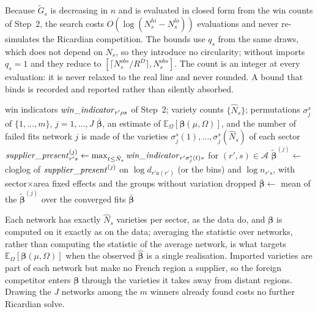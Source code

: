 Because $\tilde{G}_s$ is decreasing in $n$ and is evaluated in closed form from the win counts of Step~2, the search costs $O(\log(N^{hi}_s-N^{lo}_s))$ evaluations and never re-simulates the Ricardian competition. The bounds use $q_s$ from the same draws, which does not depend on $N_s$, so they introduce no circularity; without imports $q_s=1$ and they reduce to $[\lceil N^{obs}_s/R^D\rceil,N^{obs}_s]$. The count is an integer at every evaluation: it is never relaxed to the real line and never rounded. A bound that binds is recorded and reported rather than silently absorbed.

\begin{algorithm}[H]
\caption{\textsc{ExtensiveMarginCoefficients}: the extensive-margin coefficients, averaged over $J$ networks}
\label{alg:cellbeta}
\small
\begin{algorithmic}[1]
\Require win indicators $\mathit{win\_indicator}_{r'\rho s}$ of Step~2; variety counts $\{\hat N_s\}$; permutations $\sigma^s_j$ of $\{1,\dots,m\}$, $j=1,\dots,J$
\Ensure $\bar{\boldsymbol\beta}$, an estimate of $\mathbb{E}_\Omega[\boldsymbol\beta(\mu,\Omega)]$, and the number of failed fits
    \State network $j$ is made of the varieties $\sigma^s_j(1),\dots,\sigma^s_j(\hat N_s)$ of each sector
    \State $\mathit{supplier\_present}^{(j)}_{r's}\gets\max_{t\le\hat N_s}\mathit{win\_indicator}_{r'\sigma^s_j(t)s}$ for $(r',s)\in\mathcal{A}$
    \State $\tilde{\boldsymbol\beta}^{(j)}\gets$ cloglog of $\mathit{supplier\_present}^{(j)}$ on $\log d_{r'a(r')}$ (or the bins) and $\log n_{r's}$, with sector$\times$area fixed effects and the groups without variation dropped
\EndFor
{}
\State $\bar{\boldsymbol\beta}\gets$ mean of the $\tilde{\boldsymbol\beta}^{(j)}$ over the converged fits
\State \Return $\bar{\boldsymbol\beta}$
\end{algorithmic}
\end{algorithm}

Each network has exactly $\hat N_s$ varieties per sector, as the data do, and $\boldsymbol\beta$ is computed on it exactly as on the data; averaging the statistic over networks, rather than computing the statistic of the average network, is what targets $\mathbb{E}_\Omega[\boldsymbol\beta(\mu,\Omega)]$ when the observed $\hat{\boldsymbol\beta}$ is a single realisation. Imported varieties are part of each network but make no French region a supplier, so the foreign competitor enters $\boldsymbol\beta$ through the varieties it takes away from distant regions. Drawing the $J$ networks among the $m$ winners already found costs no further Ricardian solve.


